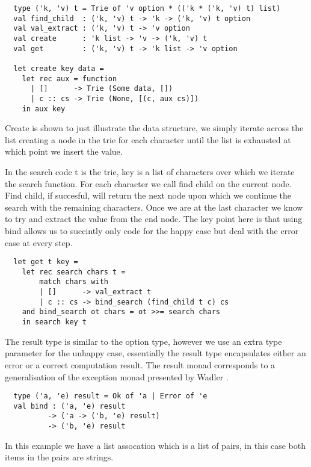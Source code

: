 \begin{verbatim}
  type ('k, 'v) t = Trie of 'v option * (('k * ('k, 'v) t) list)
  val find_child  : ('k, 'v) t -> 'k -> ('k, 'v) t option
  val val_extract : ('k, 'v) t -> 'v option
  val create      : 'k list -> 'v -> ('k, 'v) t
  val get         : ('k, 'v) t -> 'k list -> 'v option

  let create key data =
    let rec aux = function
      | []      -> Trie (Some data, [])
      | c :: cs -> Trie (None, [(c, aux cs)])
    in aux key
\end{verbatim}

Create is shown to just illustrate the data structure,
we simply iterate across the list creating a node in the trie for each character
until the list is exhausted at which point we insert the value.


In the search code t is the trie, key is a list of characters over which
we iterate the search function. For each character we call find child on
the current node. Find child, if succesful, will return the next node
upon which we continue the search with the remaining characters. Once we
are at the last character we know to try and extract the value from the end
node. The key point here is that using bind allows us to succintly only code
for the happy case but deal with the error case at every step.

\begin{verbatim}
  let get t key =
    let rec search chars t =
        match chars with
        | []      -> val_extract t
        | c :: cs -> bind_search (find_child t c) cs
    and bind_search ot chars = ot >>= search chars
    in search key t
\end{verbatim}

The result type is similar to the option type, however we use an extra type
parameter for the unhappy case, essentially the result type encapsulates 
either an error or a correct computation result. The result monad
corresponds to a generalisation of the exception monad presented by Wadler \cite{wadler1995monads}.

\begin{verbatim}
  type ('a, 'e) result = Ok of 'a | Error of 'e
  val bind : ('a, 'e) result
          -> ('a -> ('b, 'e) result)
          -> ('b, 'e) result
\end{verbatim}

In this example we have a list assocation which is a list of pairs, in this case both
items in the pairs are strings.

